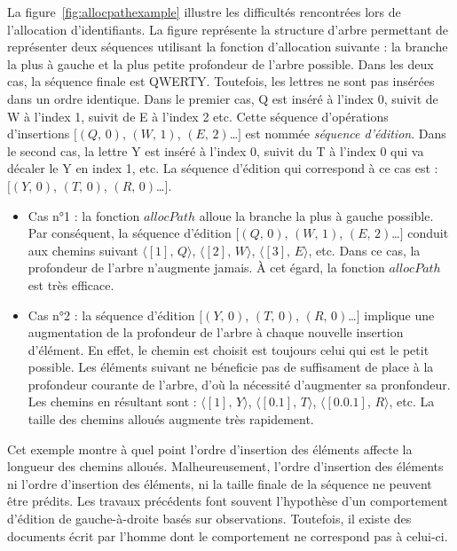 La figure~\ref{fig:allocpathexample} illustre les difficultés rencontrées lors
de l'allocation d'identifiants. La figure représente la structure d'arbre
permettant de représenter deux séquences utilisant la fonction d'allocation
suivante : la branche la plus à gauche et la plus petite profondeur de l'arbre
possible. Dans les deux cas, la séquence finale est QWERTY. Toutefois, les
lettres ne sont pas insérées dans un ordre identique. Dans le premier cas, Q est
inséré à l'index 0, suivit de W à l'index 1, suivit de E à l'index 2 etc. Cette
séquence d'opérations d'insertions $[(Q,\,0)$, $(W,\,1)$, $(E,\,2)$\ldots$]$ est
nommée \emph{séquence d'édition}. Dans le second cas, la lettre Y est inséré à
l'index 0, suivit du T à l'index 0 qui va décaler le Y en index 1, etc. La
séquence d'édition qui correspond à ce cas est : $[(Y,\,0)$, $(T,\,0)$,
$(R,\,0)$\ldots$]$.
\begin{itemize}
\item Cas n°1 : la fonction $allocPath$ alloue la branche la plus à gauche
  possible. Par conséquent, la séquence d'édition $[(Q,\,0)$, $(W,\,1)$,
  $(E,\,2)$\ldots$]$ conduit aux chemins suivant $\langle [1],\,Q\rangle$,
  $\langle [2],\, W \rangle$, $\langle [3],\, E\rangle$, etc. Dans ce cas, la
  profondeur de l'arbre n'augmente jamais. À cet égard, la fonction $allocPath$
  est très efficace.
\item Cas n°2 : la séquence d'édition $[(Y,\,0)$, $(T,\,0)$, $(R,\,0)$\ldots$]$
  implique une augmentation de la profondeur de l'arbre à chaque nouvelle
  insertion d'élément. En effet, le chemin est choisit est toujours celui qui
  est le petit possible. Les éléments suivant ne béneficie pas de suffisament de
  place à la profondeur courante de l'arbre, d'où la nécessité d'augmenter sa
  pronfondeur. Les chemins en résultant sont : $\langle [1],\, Y\rangle$,
  $\langle[0.1],\,T\rangle$, $\langle[0.0.1],\, R\rangle$, etc. La taille des
  chemins alloués augmente très rapidement.
\end{itemize}

Cet exemple montre à quel point l'ordre d'insertion des éléments affecte la
longueur des chemins alloués. Malheureusement, l'ordre d'insertion des éléments
ni l'ordre d'insertion des éléments, ni la taille finale de la séquence ne
peuvent être prédits. Les travaux précédents font souvent l'hypothèse d'un
comportement d'édition de gauche-à-droite basés sur observations. Toutefois,
il existe des documents écrit par l'homme dont le comportement ne correspond pas
à celui-ci.

